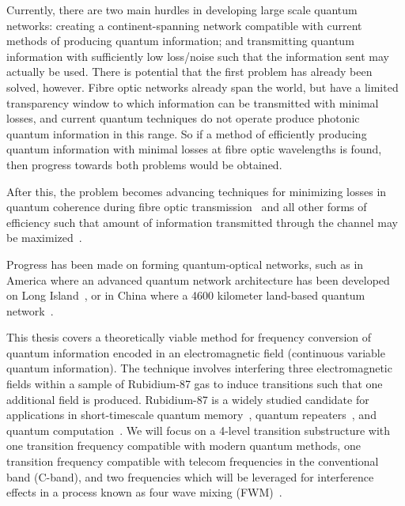 \documentclass[aps,pra,showpacs,amsmath,amssymb,nofootinbib,longbibliography,superscriptaddress
]{revtex4-1}
\theoremstyle{definition}
\theoremstyle{remark}
\newcommand{\0}{\hat{0}}
\begin{document}
Currently, there are two main hurdles in developing large scale quantum networks: creating a continent-spanning network compatible with current methods of producing quantum information; and transmitting quantum information with sufficiently low loss/noise such that the information sent may actually be used. There is potential that the first problem has already been solved, however. Fibre optic networks already span the world, but have a limited transparency window to which information can be transmitted with minimal losses, and current quantum techniques do not operate produce photonic quantum information in this range. So if a method of efficiently producing quantum information with minimal losses at fibre optic wavelengths is found, then progress towards both problems would be obtained.

After this, the problem becomes advancing techniques for minimizing losses in quantum coherence during fibre optic transmission~\cite{Qin} and all other forms of efficiency such that amount of information transmitted through the channel may be maximized~\cite{Shannon}. 

Progress has been made on forming quantum-optical networks, such as in America where an advanced quantum network architecture has been developed on Long Island~\cite{QuantumInternet}, or in China where a 4600 kilometer land-based quantum network~\cite{Chen}.

This thesis covers a theoretically viable method for frequency conversion of quantum information encoded in an electromagnetic field (continuous variable quantum information). The technique involves interfering three electromagnetic fields within a sample of Rubidium-87 gas to induce transitions such that one additional field is produced. Rubidium-87 is a widely studied candidate for applications in short-timescale quantum memory~\cite{Hosseini}\cite{Strassel}, quantum repeaters~\cite{Langenfeld}, and quantum computation~\cite{Saffman}. We will focus on a 4-level transition substructure with one transition frequency compatible with modern quantum methods, one transition frequency compatible with telecom frequencies in the conventional band (C-band), and two frequencies which will be leveraged for interference effects in a process known as four wave mixing (FWM)~\cite{Diamond}.
\end{document}
